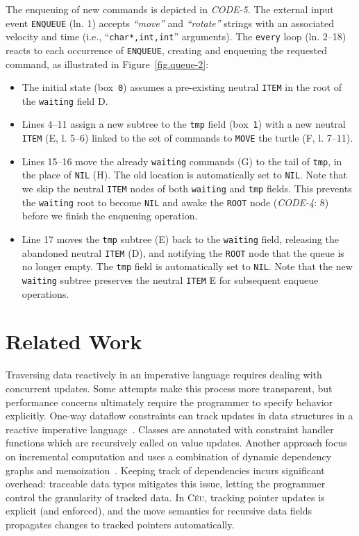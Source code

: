 \documentclass{sig-alternate}
\newcommand{\CEU}{\textsc{C\'{e}u}\xspace}
\newcommand{\code}[1] {{\small{\texttt{#1}}}}
\newcommand{\MM}[1] {\textcircled{\tiny{\textsf{#1}}}}
\begin{document}
The enqueuing of new commands is depicted in \emph{CODE-5}.
The external input event \code{ENQUEUE} (ln. 1) accepts \emph{``move''} and 
\emph{``rotate''} strings with an associated velocity and time (i.e., 
``\code{char*,int,int}'' arguments).
The \code{every} loop (ln. 2--18) reacts to each occurrence of 
\code{ENQUEUE}, creating and enqueuing the requested command, as illustrated in 
Figure~\ref{fig.queue-2}: 
%
\begin{itemize}
%
\item The initial state (box~\code{0}) assumes a pre-existing neutral 
\code{ITEM} in the root of the \code{waiting} field \MM{D}.
%
\item Lines 4--11 assign a new subtree to the \code{tmp} field (box~\code{1}) 
with a new neutral \code{ITEM} (\MM{E}, l. 5--6) linked to the set of 
commands to \code{MOVE} the turtle (\MM{F}, l. 7--11).
%
\item Lines 15--16 move the already \code{waiting} commands (\MM{G}) to the 
tail of \code{tmp}, in the place of \code{NIL} (\MM{H}).
The old location is automatically set to \code{NIL}.
Note that we skip the neutral \code{ITEM} nodes of both \code{waiting} and 
\code{tmp} fields.
This prevents the \code{waiting} root to become \code{NIL} and awake the 
\code{ROOT} node (\emph{CODE-4}: 8) before we finish the enqueuing operation.
%
\item Line 17 moves the \code{tmp} subtree (\MM{E}) back to the \code{waiting} 
field, releasing the abandoned neutral \code{ITEM} (\MM{D}), and notifying the 
\code{ROOT} node that the queue is no longer empty.
The \code{tmp} field is automatically set to \code{NIL}.
Note that the new \code{waiting} subtree preserves the neutral \code{ITEM} 
\MM{E} for subsequent enqueue operations.
%
\end{itemize}

\section{Related Work}
\label{sec.related}

Traversing data reactively in an imperative language requires dealing with 
concurrent updates.
Some attempts make this process more transparent, but performance concerns 
ultimately require the programmer to specify behavior explicitly.
%
One-way dataflow constraints can track updates in data structures in a reactive 
imperative language~\cite{ripdataflow}.
Classes are annotated with constraint handler functions which are recursively 
called on value updates.
%
Another approach focus on incremental computation and uses a combination of 
dynamic dependency graphs and memoization~\cite{selfadjusting}.
Keeping track of dependencies incurs significant overhead: traceable data types
\cite{traceable} mitigates this issue, letting the programmer control the 
granularity of tracked data.
%
In \CEU, tracking pointer updates is explicit (and enforced), and the move 
semantics for recursive data fields propagates changes to tracked pointers 
automatically.
\end{document}
